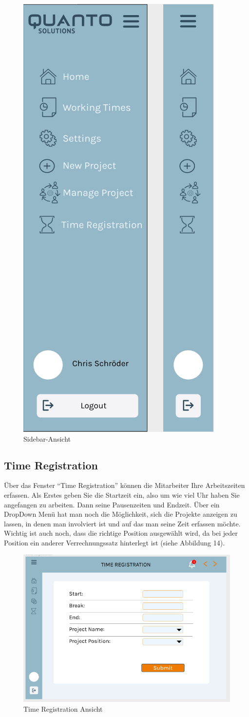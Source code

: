 \documentclass{article}
\begin{document}
\begin{figure}[h]
    \includegraphics[height= 0.5\textwidth,width= \textwidth]{images/Sidebar.png}
    \caption{Sidebar-Ansicht}
    \label{fig:beispiel}
\end{figure}

\newpage
\subsection{Time Registration}
Über das Fenster “Time Registration” können die Mitarbeiter Ihre Arbeitszeiten erfassen.  Als Erstes geben Sie die Startzeit ein, also um wie viel Uhr haben Sie angefangen zu arbeiten.
Dann seine Pausenzeiten und Endzeit. Über ein DropDown Menü hat man noch die Möglichkeit, sich die Projekte anzeigen zu lassen, in denen man involviert ist und auf das man seine Zeit erfassen möchte.
Wichtig ist auch noch, dass die richtige Position ausgewählt wird, da bei jeder Position ein anderer Verrechnungssatz hinterlegt ist (siehe Abbildung 14).
\begin{figure}[h]
    \includegraphics[height= 0.5\textwidth,width= \textwidth]{images/Time Registration.png}
    \caption{Time Registration Ansicht}
    \label{fig:beispiel}
\end{figure}
\end{document}
